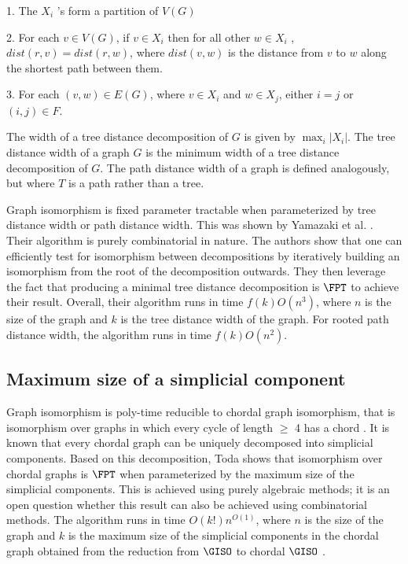 \documentclass[11pt]{report}
\begin{document}
1. The $X_i$ 's form a partition of $V(G)$

2. For each $ v\in V(G)$, if $v\in X_i$ then for all other $w\in X_i$ , $dist(r, v)=dist(r, w)$, where $dist(v,w)$ is the distance from $v$ to $w$ along the shortest path between them.

3. For each $(v,w)\in E(G)$, where $v\in X_i$ and $w\in X_j$, either $i=j$ or $(i,j)\in F$.

The width of a tree distance decomposition of $G$ is given by $\displaystyle\max_{i}|X_i|$. The tree distance width of a graph $G$ is the minimum width of a tree distance decomposition of $G$. The path distance width of a graph is defined analogously, but where $T$ is a path rather than a tree.

Graph isomorphism is fixed parameter tractable when parameterized by tree distance width or path distance width. This was shown by Yamazaki et al. \cite{Yamazaki99}. Their algorithm is purely combinatorial in nature. The authors show that one can efficiently test for isomorphism between decompositions by iteratively building an isomorphism from the root of the decomposition outwards. They then leverage the fact that producing a minimal tree distance decomposition is $\FPT$ to achieve their result. Overall, their algorithm runs in time $f(k)O(n^3)$, where $n$ is the size of the graph and $k$ is the tree distance width of the graph. For rooted path distance width, the algorithm runs in time  $f(k)O(n^2)$.






\subsection{Maximum size of a simplicial component}

Graph isomorphism is poly-time reducible to chordal graph isomorphism, that is isomorphism over graphs in which every cycle of length $\geq$ 4 has a chord \cite{Uehara05}.  It is known that every chordal graph can be uniquely decomposed into simplicial components. Based on this decomposition, Toda shows that isomorphism over chordal graphs is $\FPT$ when parameterized by the maximum size of the simplicial components. This is achieved using purely algebraic methods; it is an open question whether this result can also be achieved using combinatorial methods. The algorithm runs in time $O(k!)n^{O(1)}$, where $n$ is the size of the graph and $k$ is the maximum size of the simplicial components in the chordal graph obtained from the reduction \cite{Uehara05} from $\GISO$ to chordal $\GISO$ \cite{Toda06}.
\end{document}

